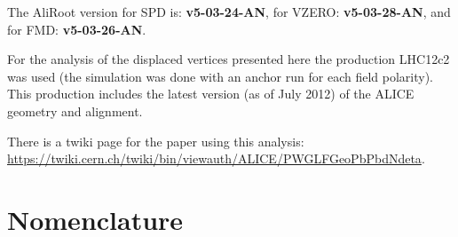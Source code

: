 \documentclass[11pt]{article}
\begin{document}
The AliRoot version for SPD is: \textbf{v5-03-24-AN}, for VZERO:
\textbf{v5-03-28-AN}, and for FMD: \textbf{v5-03-26-AN}.

For the analysis of the displaced vertices presented here the
production LHC12c2 was used (the simulation was done with an anchor
run for each field polarity). This production includes the latest
version (as of July 2012) of the ALICE geometry and alignment.

There is a twiki page for the paper using this analysis:
\url{https://twiki.cern.ch/twiki/bin/viewauth/ALICE/PWGLFGeoPbPbdNdeta}.
\clearpage
\appendix 
\section{Nomenclature} 
\label{app:nomen}
\end{document}
